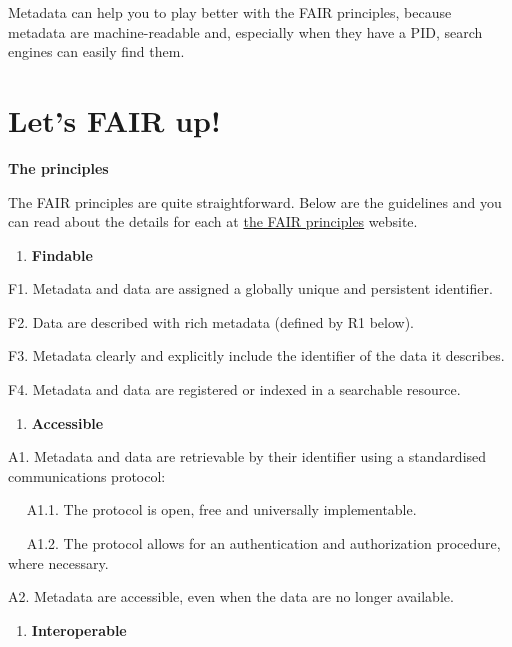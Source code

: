 \documentclass[
]{book}
\providecommand{\tightlist}{%
  \setlength{\itemsep}{0pt}\setlength{\parskip}{0pt}}
\begin{document}
Metadata can help you to play better with the FAIR principles, because metadata are machine-readable and, especially when they have a PID, search engines can easily find them.

\hypertarget{lets-fair-up}{%
\section{Let's FAIR up!}\label{lets-fair-up}}

\textbf{The principles}

The FAIR principles are quite straightforward. Below are the guidelines and you can read about the details for each at \href{https://www.go-fair.org/fair-principles/}{the FAIR principles} website.

\begin{enumerate}
\def\labelenumi{\arabic{enumi}.}
\tightlist
\item
  \textbf{Findable}
\end{enumerate}

F1. Metadata and data are assigned a globally unique and persistent identifier.

F2. Data are described with rich metadata (defined by R1 below).

F3. Metadata clearly and explicitly include the identifier of the data it describes.

F4. Metadata and data are registered or indexed in a searchable resource.

\begin{enumerate}
\def\labelenumi{\arabic{enumi}.}
\setcounter{enumi}{1}
\tightlist
\item
  \textbf{Accessible}
\end{enumerate}

A1. Metadata and data are retrievable by their identifier using a standardised communications protocol:

  A1.1. The protocol is open, free and universally implementable.

  A1.2. The protocol allows for an authentication and authorization procedure, where necessary.

A2. Metadata are accessible, even when the data are no longer available.

\begin{enumerate}
\def\labelenumi{\arabic{enumi}.}
\setcounter{enumi}{2}
\tightlist
\item
  \textbf{Interoperable}
\end{enumerate}
\end{document}
